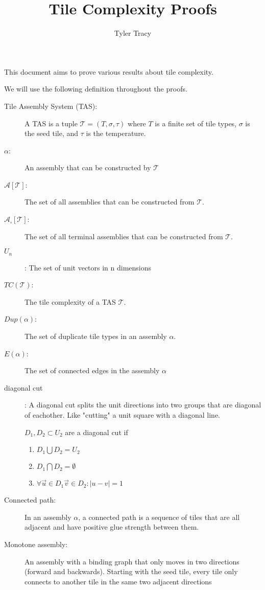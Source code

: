 \documentclass[12pt]{article}
\title{Tile Complexity Proofs}
\author{Tyler Tracy}
\begin{document}
\maketitle

This document aims to prove various results about tile complexity.

We will use the following definition throughout the proofs.

\begin{description}
    \item[Tile Assembly System (TAS):] A TAS is a tuple $\mathcal{T} = (T, \sigma, \tau)$ where $T$ is a finite set of tile types, $\sigma$ is the seed tile, and $\tau$ is the temperature.
    \item[$\alpha$:] An assembly that can be constructed by $\mathcal{T}$
    \item[{$\mathcal{A}[\mathcal{T}]$}:] The set of all assemblies that can be constructed from $\mathcal{T}$.
    \item[{$\mathcal{A}_{\square}[\mathcal{T}]$}:] The set of all terminal assemblies that can be constructed from $\mathcal{T}$.
    \item[$U_n$]: The set of unit vectors in n dimensions
    \item[{$TC(\mathcal{T})$}:] The tile complexity of a TAS $\mathcal{T}$.
    \item[$Dup(\alpha)$:] The set of duplicate tile types in an assembly $\alpha$.
    \item[$E(\alpha)$:] The set of connected edges in the assembly $\alpha$ 

    \item[diagonal cut]: A diagonal cut splits the unit directions into two groups that are diagonal of eachother. Like "cutting" a unit square with a diagonal line. 

        $D_1, D_2 \subset U_2$ are a diagonal cut if 

        \begin{enumerate}
            \item $D_1 \bigcup D_2 = U_2$
            \item $D_1 \bigcap D_2 = \emptyset$
            \item $\forall \vec{u} \in D_1 \vec{v} \in D_2 : |u - v| = 1$
        \end{enumerate}

    \item[Connected path:] In an assembly $\alpha$, a connected path is a sequence of tiles that are all adjacent and have positive glue strength between them.
    \item[Monotone assembly:] An assembly with a binding graph that only moves in two directions (forward and backwards). Starting with the seed tile, every tile only connects to another tile in the same two adjacent directions


\end{description}
\end{document}

